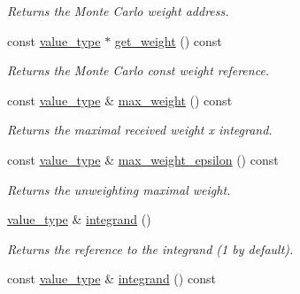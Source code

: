 \begin{DoxyCompactItemize}
\begin{DoxyCompactList}\small\item\em Returns the Monte Carlo weight address. \end{DoxyCompactList}\item 
\hypertarget{a00362_ae93f0d3b1d33b366c02eabd3bb96d4af}{const \hyperlink{a00362_a3353150105036deac9bde097cbf1d8af}{value\-\_\-type} $\ast$ \hyperlink{a00362_ae93f0d3b1d33b366c02eabd3bb96d4af}{get\-\_\-weight} () const }\label{a00362_ae93f0d3b1d33b366c02eabd3bb96d4af}

\begin{DoxyCompactList}\small\item\em Returns the Monte Carlo const weight reference. \end{DoxyCompactList}\item 
\hypertarget{a00362_a0cd549783394d82b83a08e61129962e1}{const \hyperlink{a00362_a3353150105036deac9bde097cbf1d8af}{value\-\_\-type} \& \hyperlink{a00362_a0cd549783394d82b83a08e61129962e1}{max\-\_\-weight} () const }\label{a00362_a0cd549783394d82b83a08e61129962e1}

\begin{DoxyCompactList}\small\item\em Returns the maximal received weight x integrand. \end{DoxyCompactList}\item 
\hypertarget{a00362_a8c6942c4436c03b0161e2c4d26678969}{const \hyperlink{a00362_a3353150105036deac9bde097cbf1d8af}{value\-\_\-type} \& \hyperlink{a00362_a8c6942c4436c03b0161e2c4d26678969}{max\-\_\-weight\-\_\-epsilon} () const }\label{a00362_a8c6942c4436c03b0161e2c4d26678969}

\begin{DoxyCompactList}\small\item\em Returns the unweighting maximal weight. \end{DoxyCompactList}\item 
\hypertarget{a00362_a78a6d652735c5dc763df158d96a4b21f}{\hyperlink{a00362_a3353150105036deac9bde097cbf1d8af}{value\-\_\-type} \& \hyperlink{a00362_a78a6d652735c5dc763df158d96a4b21f}{integrand} ()}\label{a00362_a78a6d652735c5dc763df158d96a4b21f}

\begin{DoxyCompactList}\small\item\em Returns the reference to the integrand (1 by default). \end{DoxyCompactList}\item 
\hypertarget{a00362_a060c92907fe56ef2f1a2a6baedba0623}{const \hyperlink{a00362_a3353150105036deac9bde097cbf1d8af}{value\-\_\-type} \& \hyperlink{a00362_a060c92907fe56ef2f1a2a6baedba0623}{integrand} () const }\label{a00362_a060c92907fe56ef2f1a2a6baedba0623}


\end{DoxyCompactItemize}
